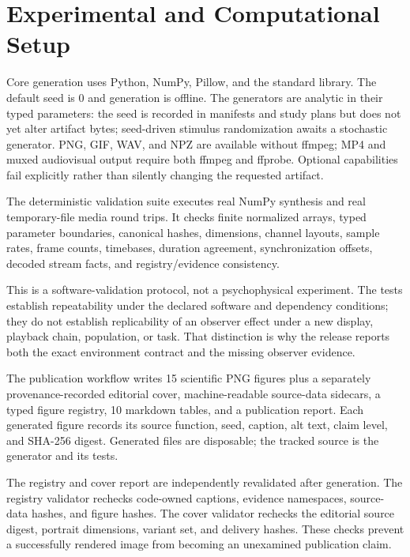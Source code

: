 \documentclass[
  english,
]{article}
\begin{document}
\newpage

\section{Experimental and Computational
Setup}\label{sec:experimental_setup}

Core generation uses Python, NumPy, Pillow, and the standard library.
The default seed is 0 and generation is offline. The generators are
analytic in their typed parameters: the seed is recorded in manifests
and study plans but does not yet alter artifact bytes; seed-driven
stimulus randomization awaits a stochastic generator. PNG, GIF, WAV, and
NPZ are available without ffmpeg; MP4 and muxed audiovisual output
require both ffmpeg and ffprobe. Optional capabilities fail explicitly
rather than silently changing the requested artifact.

The deterministic validation suite executes real NumPy synthesis and
real temporary-file media round trips. It checks finite normalized
arrays, typed parameter boundaries, canonical hashes, dimensions,
channel layouts, sample rates, frame counts, timebases, duration
agreement, synchronization offsets, decoded stream facts, and
registry/evidence consistency.

This is a software-validation protocol, not a psychophysical experiment.
The tests establish repeatability under the declared software and
dependency conditions; they do not establish replicability of an
observer effect under a new display, playback chain, population, or
task. That distinction is why the release reports both the exact
environment contract and the missing observer evidence.

The publication workflow writes 15 scientific PNG figures plus a
separately provenance-recorded editorial cover, machine-readable
source-data sidecars, a typed figure registry, 10 markdown tables, and a
publication report. Each generated figure records its source function,
seed, caption, alt text, claim level, and SHA-256 digest. Generated
files are disposable; the tracked source is the generator and its tests.

The registry and cover report are independently revalidated after
generation. The registry validator rechecks code-owned captions,
evidence namespaces, source-data hashes, and figure hashes. The cover
validator rechecks the editorial source digest, portrait dimensions,
variant set, and delivery hashes. These checks prevent a successfully
rendered image from becoming an unexamined publication claim.
\end{document}
